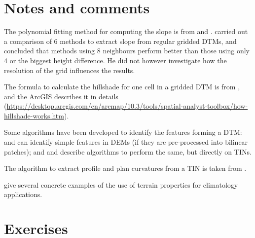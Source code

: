 %
\section{Notes and comments}

The polynomial fitting method for computing the slope is from \citet{Evans80} and \citet{Wood96}.
\citet{Skidmore89} carried out a comparison of 6 methods to extract slope from regular gridded DTMs, and concluded that methods using 8 neighbours perform better than those using only 4 or the biggest height difference.
He did not however investigate how the resolution of the grid influences the results.

The formula to calculate the hillshade for one cell in a gridded DTM is from \citet{Burrough98}, and the ArcGIS describes it in details (\url{https://desktop.arcgis.com/en/arcmap/10.3/tools/spatial-analyst-toolbox/how-hillshade-works.htm}).

Some algorithms have been developed to identify the features forming a DTM: \citet{Kweon94} and \citet{Schneider05} can identify simple features in DEMs (if they are pre-processed into bilinear patches); and \citet{Magillo09} and \citet{Edelsbrunner01-1} describe algorithms to perform the same, but directly on TINs.

The algorithm to extract profile and plan curvatures from a TIN is taken from \citet{vanKreveld97}.

\citet{Bohner09} give several concrete examples of the use of terrain properties for climatology applications.



%
\section{Exercises}

